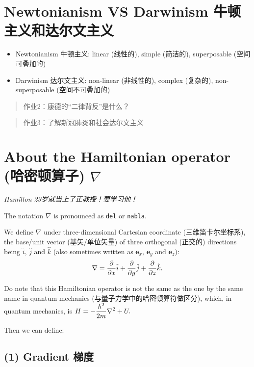 \section{Newtonianism VS Darwinism 牛顿主义和达尔文主义}\label{newtonianism-vs-darwinism-ux725bux987fux4e3bux4e49ux548cux8fbeux5c14ux6587ux4e3bux4e49}

\begin{itemize}
\tightlist{}
\item
  Newtonianism 牛顿主义: linear (线性的), simple (简洁的), superposable (空间可叠加的)
\item
  Darwinism 达尔文主义: non-linear (非线性的), complex (复杂的), non-superposable (空间不可叠加的)
\end{itemize}

\begin{quote}
作业2：康德的``二律背反''是什么？
\end{quote}

\begin{quote}
作业3：了解新冠肺炎和社会达尔文主义
\end{quote}

\section{About the Hamiltonian operator (哈密顿算子) \(\nabla\)}\label{about-the-hamiltonian-operator-ux54c8ux5bc6ux987fux7b97ux5b50-nabla}

\emph{Hamilton 23岁就当上了正教授！要学习他！}

The notation \(\nabla\) is pronounced as \texttt{del} or \texttt{nabla}.

We define \(\nabla\) under three-dimensional Cartesian coordinate (三维笛卡尔坐标系), the base/unit vector (基矢/单位矢量) of three orthogonal (正交的) directions being \(\hat i\), \(\hat j\) and \(\hat k\) (also sometimes written as \(\boldsymbol e_x\), \(\boldsymbol e_y\) and \(\boldsymbol e_z\)): \[\nabla= {\partial \over \partial x}\hat i + {\partial \over \partial y}\hat j + {\partial \over \partial z}\hat k.\]

Do note that this Hamiltonian operator is not the same as the one by the same name in quantum mechanics (与量子力学中的哈密顿算符做区分), which, in quantum mechanics, is \(\displaystyle H= -{\hbar^2 \over 2m} \nabla^2 + U.\)

Then we can define:

\subsection*{(1) Gradient 梯度}\label{gradient-ux68afux5ea6}

